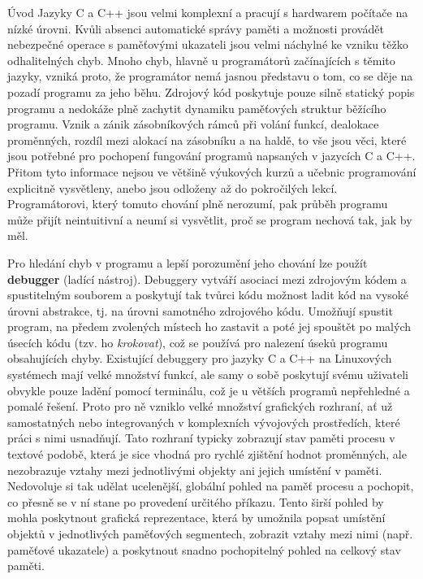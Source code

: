 \documentclass[czech,bachelor,male,python,dept460]{diploma}						%
\newcommand{\parspace}[1][]{
	\ifthenelse{\isempty{#1}}{\vspace{5mm}}{\vspace{#1}}
	\par
}
\begin{document}
\MakeTitlePages

\begin{section}{Úvod}
	Jazyky C a C++ jsou velmi komplexní a pracují s hardwarem počítače na nízké úrovni.
	Kvůli absenci automatické správy paměti a možnosti provádět nebezpečné operace s paměťovými ukazateli jsou velmi náchylné ke vzniku těžko odhalitelných chyb.
	Mnoho chyb, hlavně u programátorů začínajících s těmito jazyky, vzniká proto, že programátor nemá jasnou představu o tom, co se děje na pozadí programu za
	jeho běhu. Zdrojový kód poskytuje pouze silně statický popis programu a nedokáže plně zachytit dynamiku paměťových struktur běžícího programu.
	Vznik a zánik zásobníkových rámců při volání funkcí, dealokace proměnných, rozdíl mezi alokací na zásobníku a na haldě,
	to vše jsou věci, které jsou potřebné pro pochopení fungování programů napsaných v jazycích C a C++. Přitom tyto informace nejsou ve většině výukových kurzů
	a učebnic programování explicitně vysvětleny, anebo jsou odloženy až do pokročilých lekcí. Programátorovi, který tomuto chování plně nerozumí,
	pak průběh programu může přijít neintuitivní a neumí si vysvětlit, proč se program nechová tak, jak by měl.
	
	\parspace Pro hledání chyb v programu a lepší porozumění jeho chování lze použít \textbf{debugger} (ladící nástroj).
	Debuggery vytváří asociaci mezi zdrojovým kódem a spustitelným souborem a poskytují tak tvůrci kódu možnost ladit kód
	na vysoké úrovni abstrakce, tj. na úrovni samotného zdrojového kódu. Umožňují spustit program, na předem zvolených místech ho zastavit a poté jej spouštět
	po malých úsecích kódu (tzv. ho \textit{krokovat}), což se používá pro nalezení úseků programu obsahujících chyby. Existující debuggery pro jazyky C a C++ na
	Linuxových systémech mají velké množství funkcí, ale samy o sobě poskytují svému uživateli obvykle pouze ladění pomocí terminálu, což je u větších programů
	nepřehledné a pomalé řešení. Proto pro ně vzniklo velké množství grafických rozhraní, ať už samostatných nebo integrovaných v komplexních vývojových prostředích,
	které práci s nimi usnadňují. Tato rozhraní typicky zobrazují stav paměti procesu v textové podobě, která je sice vhodná pro rychlé
	zjištění hodnot proměnných, ale nezobrazuje vztahy mezi jednotlivými objekty ani jejich umístění v paměti.
	Nedovoluje si tak udělat ucelenější, globální pohled na paměť procesu a pochopit, co přesně se v ní stane po provedení určitého příkazu.
	Tento širší pohled by mohla poskytnout grafická reprezentace, která by umožnila popsat umístění objektů v jednotlivých paměťových segmentech,
	zobrazit vztahy mezi nimi (např. paměťové ukazatele) a poskytnout snadno pochopitelný pohled na celkový stav paměti.
	

\end{section}
\end{document}
